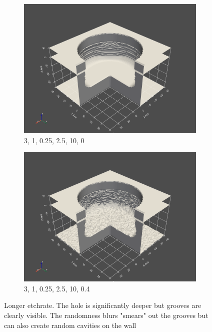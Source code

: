\begin{figure}[h]
    \begin{subfigure}{0.45\textwidth}
    \includegraphics[width=1\linewidth]{res/task2.2_uniformLong.png} 
    \caption{3, 1, 0.25, 2.5, 10, 0}
    
\end{subfigure}
    \begin{subfigure}{0.45\textwidth}
    \includegraphics[width=1\linewidth]{res/task2.2_randomLong.png}
    \caption{3, 1, 0.25, 2.5, 10, 0.4}
\end{subfigure}

\caption{Longer etchrate. The hole is significantly deeper but grooves are clearly visible. The randomness blurs "smears" out the grooves but can also create random cavities on the wall}
\end{figure}


